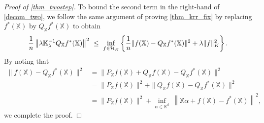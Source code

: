 \documentclass[10pt,a4paper]{amsart}
\def\KK{\mathbb{K}}
\def\RR{\mathbb{R}}
\def\XX{\mathbb{X}}
\def\cH{\mathcal H}
\def\l{\left}
\def\r{\right}
\begin{document}
\begin{proof}[Proof of \cref{thm_twostep}]
To bound the second term in the right-hand of \eqref{decom_two}, we follow the same argument of proving \cref{thm_krr_fix} by replacing $f^*(\XX)$ by $Q_{\XX} f^*(\XX)$ to obtain
\begin{align*}
     {1 \over n}\l \|  \lambda \KK_{\lambda}^{-1}  Q_{\XX}  f^*  (\XX)\r\|^2 ~ \le~   \inf_{f\in \cH_K}\l\{
            {1\over n} \|f(\XX) -Q_{\XX} f^*(\XX)\|^2 + \lambda \|f\|_K^2
        \r\}.
\end{align*}
By noting that
\begin{align*}
   \|f(\XX) -Q_{\XX} f^*(\XX)\|^2   &  
   = \|P_{\XX} f(\XX) +  Q_{\XX} f(\XX) -Q_{\XX} f^*(\XX)\|^2 \\
   & = \|P_{\XX} f(\XX) \|^2+ \|  Q_{\XX} f(\XX) -Q_{\XX} f^*(\XX)\|^2
   \\
   & = \|P_{\XX} f(\XX) \|^2+ \inf_{\alpha\in \RR^d} ~\l \| \XX\alpha+  f(\XX) - f^*(\XX)\r\|^2, 
\end{align*}
we complete the proof. 
\end{proof}
\end{document}
